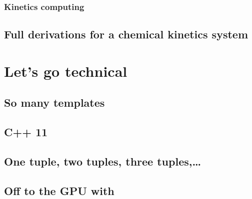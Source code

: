 \documentclass[twoside]{report}
\begin{document}
\subsection{Kinetics computing}
\label{kinetics_comput}


\section{Full derivations for a chemical kinetics system}
\label{derivations}



\chapter{Let's go technical}
\chaptermark{\ANTIOCHTech}
\label{Antioch:technique}

\section{So many templates}

\section{C++ 11}

\section{One tuple, two tuples, three tuples,\dots}

\section{\EIGEN}

\section{\Boost}

\section{\MetaPhysicL}

\section{Off to the GPU with \VexCL}

\section{\ViennaCL}
\end{document}
